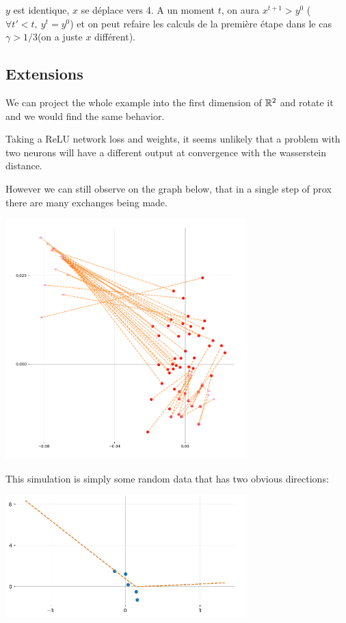 $y$ est identique, $x$ se déplace vers 4. A un moment $t$, on aura $x^{t+1} > y^{0}$ ($\forall t' < t, \ y^t = y^0$) et on peut refaire les calculs de la première étape dans le cas $\gamma > 1/3$(on a juste $x$ différent).

\subsection{Extensions}

We can project the whole example into the first dimension of $\mathbb{R}^2$ and rotate it and we would find the same behavior.

Taking a ReLU network loss and weights, it seems unlikely that a problem with two neurons will have a different output at convergence with the wasserstein distance.

However we can still observe on the graph below, that in a single step of prox there are many exchanges being made.

\includegraphics[width=0.7\textwidth]{imgs/graph_onlypositives.png}

This simulation is simply some random data that has two obvious directions:

\includegraphics[width=0.7\textwidth]{imgs/graph_onlypositives_data.png}

